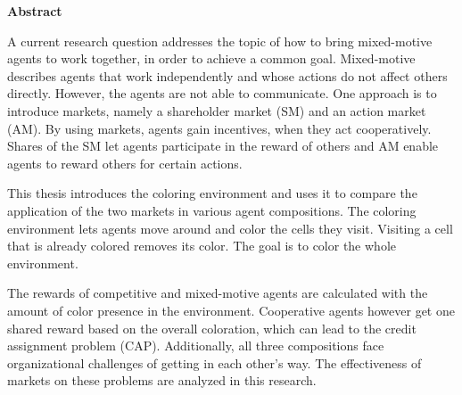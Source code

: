 %
%
\vspace*{2cm}

\begin{center}
    \textbf{Abstract}
\end{center}

\vspace*{1cm}

\noindent A current research question addresses the topic of how to bring mixed-motive agents to work together, in order to achieve a common goal. Mixed-motive describes agents that work independently and whose actions do not affect others directly. However, the agents are not able to communicate. One approach is to introduce markets, namely a shareholder market (SM) and an action market (AM). By using markets, agents gain incentives, when they act cooperatively. Shares of the SM let agents participate in the reward of others and AM enable agents to reward others for certain actions.

This thesis introduces the coloring environment and uses it to compare the application of the two markets in various agent compositions. The coloring environment lets agents move around and color the cells they visit. Visiting a cell that is already colored removes its color. The goal is to color the whole environment.

The rewards of competitive and mixed-motive agents are calculated with the amount of color presence in the environment. Cooperative agents however get one shared reward based on the overall coloration, which can lead to the credit assignment problem (CAP). Additionally, all three compositions face organizational challenges of getting in each other's way. The effectiveness of markets on these problems are analyzed in this research. 